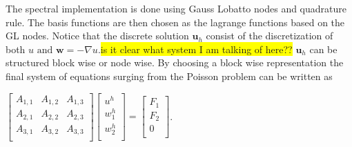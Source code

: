 The spectral implementation is done using Gauss Lobatto nodes and quadrature rule. The basis functions are then chosen as the lagrange functions based on the GL nodes. Notice that the discrete solution $\mathbf{u}_h$ consist of the discretization of both $u \text{ and } \mathbf{w} = - \nabla u$.\colorbox{yellow}{is it clear what system I am talking of here??} $\mathbf{u}_h$ can be structured block wise or node wise. By choosing a block wise representation the final system of equations surging from the Poisson problem can be written as 

$
\begin{bmatrix}
	A_{1,1} & A_{1,2} &	A_{1,3} \\ 	
	A_{2,1} & A_{2,2} & A_{2,3} \\ 	
	A_{3,1} & A_{3,2} & A_{3,3} \\ 	
\end{bmatrix}
\begin{bmatrix}
 u^h \\ 	
 w^h_1\\ 	
 w^h_2\\ 	
\end{bmatrix}
=
\begin{bmatrix}
 F_1 \\ 	
 F_2\\ 	
 0 \\ 	
\end{bmatrix}
$.

